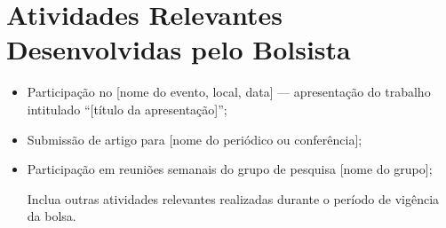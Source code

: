 \section{Atividades Relevantes Desenvolvidas pelo Bolsista}


\begin{itemize}
    \item Participação no [nome do evento, local, data] — apresentação do trabalho intitulado
          ``[título da apresentação]'';
    \item Submissão de artigo para [nome do periódico ou conferência];
    \item Participação em reuniões semanais do grupo de pesquisa [nome do grupo];
    \item [Inclua outras atividades relevantes realizadas durante o período de vigência da bolsa.]
\end{itemize}